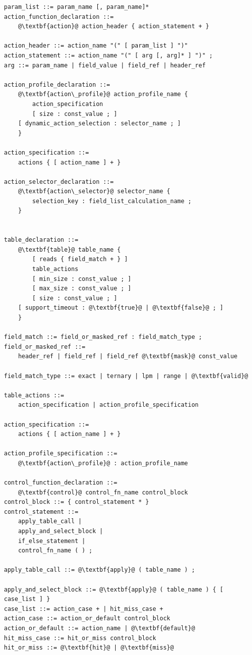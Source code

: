 \documentclass[12pt]{article}
\begin{document}
\begin{lstlisting}[frame=single,backgroundcolor=\color{bnfgreen},escapechar=\@]
param_list ::= param_name [, param_name]*
action_function_declaration ::=
    @\textbf{action}@ action_header { action_statement + }

action_header ::= action_name "(" [ param_list ] ")"
action_statement ::= action_name "(" [ arg [, arg]* ] ")" ;
arg ::= param_name | field_value | field_ref | header_ref

action_profile_declaration ::=
    @\textbf{action\_profile}@ action_profile_name {
        action_specification
        [ size : const_value ; ]
	[ dynamic_action_selection : selector_name ; ]
    }

action_specification ::= 
    actions { [ action_name ] + }

action_selector_declaration ::=
    @\textbf{action\_selector}@ selector_name {
        selection_key : field_list_calculation_name ;
    }


table_declaration ::=
    @\textbf{table}@ table_name {
        [ reads { field_match + } ]
        table_actions
        [ min_size : const_value ; ]
        [ max_size : const_value ; ]
        [ size : const_value ; ]
	[ support_timeout : @\textbf{true}@ | @\textbf{false}@ ; ]
    }

field_match ::= field_or_masked_ref : field_match_type ;
field_or_masked_ref ::= 
    header_ref | field_ref | field_ref @\textbf{mask}@ const_value

field_match_type ::= exact | ternary | lpm | range | @\textbf{valid}@

table_actions ::= 
    action_specification | action_profile_specification

action_specification ::= 
    actions { [ action_name ] + }

action_profile_specification ::= 
    @\textbf{action\_profile}@ : action_profile_name

control_function_declaration ::=
    @\textbf{control}@ control_fn_name control_block
control_block ::= { control_statement * }
control_statement ::= 
    apply_table_call |
    apply_and_select_block |
    if_else_statement |
    control_fn_name ( ) ;

apply_table_call ::= @\textbf{apply}@ ( table_name ) ;

apply_and_select_block ::= @\textbf{apply}@ ( table_name ) { [ case_list ] }
case_list ::= action_case + | hit_miss_case +
action_case ::= action_or_default control_block
action_or_default ::= action_name | @\textbf{default}@
hit_miss_case ::= hit_or_miss control_block
hit_or_miss ::= @\textbf{hit}@ | @\textbf{miss}@


\end{lstlisting}
\end{document}
